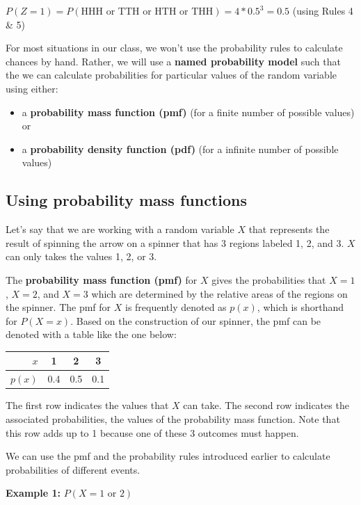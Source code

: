\documentclass[
]{book}
\providecommand{\tightlist}{%
  \setlength{\itemsep}{0pt}\setlength{\parskip}{0pt}}
\begin{document}
\(P(Z = 1) = P(\text{HHH or TTH or HTH or THH}) = 4*0.5^3 = 0.5\) (using Rules 4 \& 5)

For most situations in our class, we won't use the probability rules to calculate chances by hand. Rather, we will use a \textbf{named probability model} such that the we can calculate probabilities for particular values of the random variable using either:

\begin{itemize}
\tightlist
\item
  a \textbf{probability mass function (pmf)} (for a finite number of possible values) or
\item
  a \textbf{probability density function (pdf)} (for a infinite number of possible values)
\end{itemize}

\hypertarget{using-probability-mass-functions}{%
\subsection{Using probability mass functions}\label{using-probability-mass-functions}}

Let's say that we are working with a random variable \(X\) that represents the result of spinning the arrow on a spinner that has 3 regions labeled 1, 2, and 3. \(X\) can only takes the values 1, 2, or 3.

The \textbf{probability mass function (pmf)} for \(X\) gives the probabilities that \(X=1\), \(X=2\), and \(X=3\) which are determined by the relative areas of the regions on the spinner. The pmf for \(X\) is frequently denoted as \(p(x)\), which is shorthand for \(P(X = x)\). Based on the construction of our spinner, the pmf can be denoted with a table like the one below:

\begin{longtable}[]{@{}rccc@{}}
\toprule
\(x\) & 1 & 2 & 3\tabularnewline
\midrule
\endhead
\(p(x)\) & 0.4 & 0.5 & 0.1\tabularnewline
\bottomrule
\end{longtable}

The first row indicates the values that \(X\) can take. The second row indicates the associated probabilities, the values of the probability mass function. Note that this row adds up to 1 because one of these 3 outcomes must happen.

We can use the pmf and the probability rules introduced earlier to calculate probabilities of different events.

\textbf{Example 1:} \(P(X = 1 \text{ or } 2)\)
\end{document}
